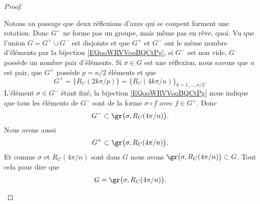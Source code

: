 \begin{proof}
\begin{subproof}
\begin{subproof}
			Notons au passage que deux réflexions d'axes qui se coupent forment une rotation. Donc \( G^-\) ne forme pas un groupe, mais même pas en rêve, quoi.
			Vu que l'union \( G=G^+\cup G^-\) est disjointe et que \( G^+\) et \( G^-\) ont le même nombre d'éléments par la bijection \ref{EQooWRVVooBQCtPg}, si \( G^-\) est non vide, \( G\) possède un nombre pair d'éléments.
			Si \( \sigma\in G\) est une réflexion, nous savons que \( n\) est pair, que \( G^+\) possède \( p=n/2\) éléments et que
			\begin{equation}
				G^+=\{  R_C(2k\pi/p)  \}=\{  R_C(4k\pi/n) \}_{k=1,\ldots, n/2}.
			\end{equation}
			L'élément \( \sigma\in G^- \) étant fixé, la bijection \eqref{EQooWRVVooBQCtPg} nous indique que tous les éléments de \( G^-\) sont de la forme \( \sigma\circ f\) avec \( f\in G^+\). Donc
			\begin{equation}
				G^{-}\subset \gr\big( \sigma, R_C(4\pi/n)  \big).
			\end{equation}
			Nous avons aussi
			\begin{equation}
				G^+\subset \gr\big( \sigma,  R_C(4\pi/n)  \big).
			\end{equation}
			Et comme \( \sigma\) et \(  R_C(4\pi/n)  \) sont dans \( G\) nous avons \( \gr\big( \sigma ,  R_C(4\pi/n)  \big)\subset G\). Tout cela pour dire que
			\begin{equation}
				G=\gr\big( \sigma,  R_C(4\pi/n) \big).
			\end{equation}


\end{subproof}
\end{subproof}
\end{proof}
